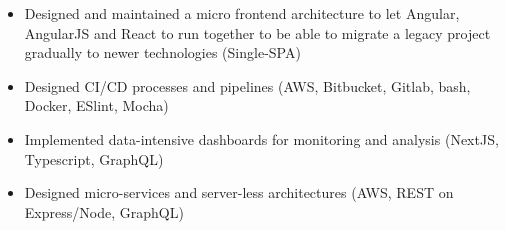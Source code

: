 \documentclass[10pt,a4paper,ragged2e]{altacv}
\newcommand\faSkype{{\FA\symbol{"F17E}}}
\begin{document}

\begin{fullwidth}
\makecvheader
\end{fullwidth}



\begin{itemize}
\item Designed and maintained a micro frontend architecture to let Angular, AngularJS and React to run together to be able to migrate a legacy  project gradually to newer technologies (Single-SPA)
\item Designed CI/CD processes and pipelines (AWS, Bitbucket, Gitlab, bash, Docker, ESlint, Mocha)
\item Implemented data-intensive dashboards for monitoring and analysis (NextJS, Typescript, GraphQL)
\item Designed micro-services and server-less architectures (AWS, REST on Express/Node, GraphQL)

\end{itemize}

\divider
\end{document}
